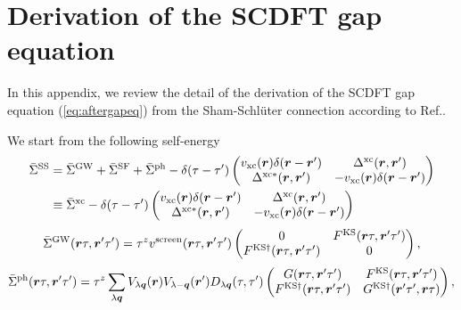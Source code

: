 

%
%
\appendix
\chapter{Derivation of the SCDFT gap equation}
\label{appdx:gapeq}
In this appendix, we review the detail of the derivation of the SCDFT gap equation
(\ref{eq:aftergapeq}) from the Sham-Schl\"{u}ter connection according to Ref.\cite{MarquesphD}.

We start from the following self-energy
%
\begin{equation}
	\begin{split}
	\bar{\Sigma}^{\rm SS} &= \bar{\Sigma}^{\rm GW} + \bar{\Sigma}^{\rm SF} + \bar{\Sigma}^{\rm ph}
	-\delta(\tau - \tau') 
	\begin{pmatrix}
		 v_{\rm xc}(\bm r)\delta(\bm r - \bm r')  &   \Delta^{\rm xc}(\bm r, \bm r')   \\
		 \Delta^{\rm xc\ast}(\bm r, \bm r')  & - v_{\rm xc}(\bm r)\delta(\bm r - \bm r')
	\end{pmatrix} \\
	& \equiv \bar{\Sigma}^{\rm xc} - \delta(\tau - \tau')
	\begin{pmatrix}
		 v_{\rm xc}(\bm r)\delta(\bm r - \bm r')  &   \Delta^{\rm xc}(\bm r, \bm r')   \\
		 \Delta^{\rm xc\ast}(\bm r, \bm r')  & - v_{\rm xc}(\bm r)\delta(\bm r - \bm r')
	\end{pmatrix} \\
	\label{eq:appSSself}
\end{split}
\end{equation}
%
\begin{equation}
	\bar{\Sigma}^{\rm GW}(\bm r \tau, \bm r' \tau') = \tau^z v^{\rm screen}(\bm r \tau, \bm r' \tau')
	\begin{pmatrix}
		0  &   F^{\rm KS}(\bm r \tau, \bm r' \tau')   \\
		F^{\rm KS\dag}(\bm r \tau, \bm r' \tau')  & 0
	\end{pmatrix},
	\label{eq:GWself}
\end{equation}
%
\begin{equation}
	\bar{\Sigma}^{\rm ph}(\bm r \tau, \bm r' \tau') = \tau^z \sum_{\lambda \bm q}
	V_{\lambda \bm q}(\bm r)V_{\lambda -\bm q}(\bm r') D_{\lambda\bm q}(\tau, \tau')
	\begin{pmatrix}
		G(\bm r \tau, \bm r' \tau')  &   F^{\rm KS}(\bm r \tau, \bm r' \tau')   \\
		F^{\rm KS\dag}(\bm r \tau, \bm r' \tau')  & G^{\rm KS\dag}(\bm r' \tau', \bm r \tau)
	\end{pmatrix},
	\label{eq:phself}
\end{equation}
